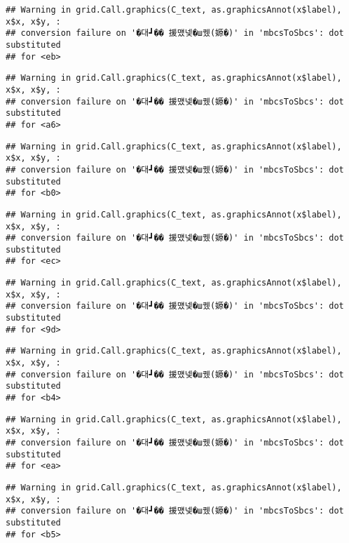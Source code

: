 \documentclass[
]{article}
\begin{document}
\begin{verbatim}
## Warning in grid.Call.graphics(C_text, as.graphicsAnnot(x$label), x$x, x$y, :
## conversion failure on '�대┛�� 援먰넻�ш퀬(嫄�)' in 'mbcsToSbcs': dot substituted
## for <eb>
\end{verbatim}

\begin{verbatim}
## Warning in grid.Call.graphics(C_text, as.graphicsAnnot(x$label), x$x, x$y, :
## conversion failure on '�대┛�� 援먰넻�ш퀬(嫄�)' in 'mbcsToSbcs': dot substituted
## for <a6>
\end{verbatim}

\begin{verbatim}
## Warning in grid.Call.graphics(C_text, as.graphicsAnnot(x$label), x$x, x$y, :
## conversion failure on '�대┛�� 援먰넻�ш퀬(嫄�)' in 'mbcsToSbcs': dot substituted
## for <b0>
\end{verbatim}

\begin{verbatim}
## Warning in grid.Call.graphics(C_text, as.graphicsAnnot(x$label), x$x, x$y, :
## conversion failure on '�대┛�� 援먰넻�ш퀬(嫄�)' in 'mbcsToSbcs': dot substituted
## for <ec>
\end{verbatim}

\begin{verbatim}
## Warning in grid.Call.graphics(C_text, as.graphicsAnnot(x$label), x$x, x$y, :
## conversion failure on '�대┛�� 援먰넻�ш퀬(嫄�)' in 'mbcsToSbcs': dot substituted
## for <9d>
\end{verbatim}

\begin{verbatim}
## Warning in grid.Call.graphics(C_text, as.graphicsAnnot(x$label), x$x, x$y, :
## conversion failure on '�대┛�� 援먰넻�ш퀬(嫄�)' in 'mbcsToSbcs': dot substituted
## for <b4>
\end{verbatim}

\begin{verbatim}
## Warning in grid.Call.graphics(C_text, as.graphicsAnnot(x$label), x$x, x$y, :
## conversion failure on '�대┛�� 援먰넻�ш퀬(嫄�)' in 'mbcsToSbcs': dot substituted
## for <ea>
\end{verbatim}

\begin{verbatim}
## Warning in grid.Call.graphics(C_text, as.graphicsAnnot(x$label), x$x, x$y, :
## conversion failure on '�대┛�� 援먰넻�ш퀬(嫄�)' in 'mbcsToSbcs': dot substituted
## for <b5>
\end{verbatim}
\end{document}

